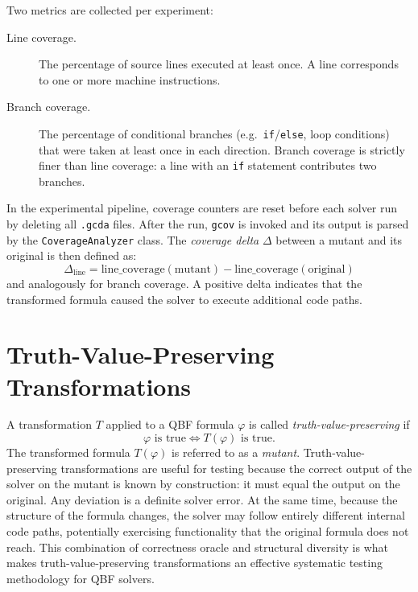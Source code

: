 Two metrics are collected per experiment:

\begin{description}
  \item[Line coverage.] The percentage of source lines executed at least once. A line corresponds to one or more machine instructions.
  \item[Branch coverage.] The percentage of conditional branches (e.g.\ \texttt{if}/\texttt{else}, loop conditions) that were taken at least once in each direction. Branch coverage is strictly finer than line coverage: a line with an \texttt{if} statement contributes two branches.
\end{description}

In the experimental pipeline, coverage counters are reset before each solver run by deleting all \texttt{.gcda} files. After the run, \texttt{gcov} is invoked and its output is parsed by the \texttt{CoverageAnalyzer} class. The \emph{coverage delta} $\Delta$ between a mutant and its original is then defined as:
\[
  \Delta_{\text{line}} = \text{line\_coverage}(\text{mutant}) - \text{line\_coverage}(\text{original})
\]
and analogously for branch coverage. A positive delta indicates that the transformed formula caused the solver to execute additional code paths.

\section{Truth-Value-Preserving Transformations}\label{sec:tvp}

A transformation $T$ applied to a QBF formula $\varphi$ is called \emph{truth-value-preserving} if
\[
  \varphi \text{ is true} \iff T(\varphi) \text{ is true.}
\]
The transformed formula $T(\varphi)$ is referred to as a \emph{mutant}. Truth-value-preserving transformations are useful for testing because the correct output of the solver on the mutant is known by construction: it must equal the output on the original. Any deviation is a definite solver error. At the same time, because the structure of the formula changes, the solver may follow entirely different internal code paths, potentially exercising functionality that the original formula does not reach. This combination of correctness oracle and structural diversity is what makes truth-value-preserving transformations an effective systematic testing methodology for QBF solvers.

